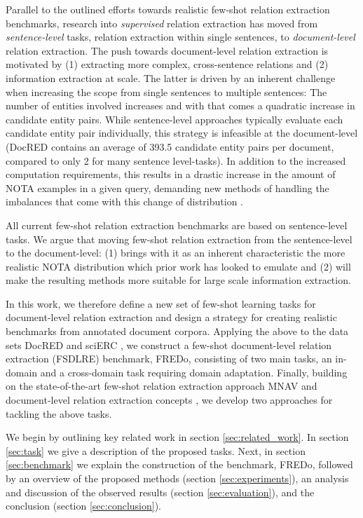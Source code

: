 \documentclass[11pt]{article}
\begin{document}
Parallel to the outlined efforts towards realistic few-shot relation extraction benchmarks, research into \textit{supervised} relation extraction has moved from \textit{sentence-level} tasks, relation extraction within single sentences, to \textit{document-level} relation extraction.
The push towards document-level relation extraction is motivated by (1) extracting more complex, cross-sentence relations and (2) information extraction at scale.
The latter is driven by an inherent challenge when increasing the scope from single sentences to multiple sentences: The number of entities involved increases and with that comes a quadratic increase in candidate entity pairs.
While sentence-level approaches typically evaluate each candidate entity pair individually, this strategy is infeasible at the document-level (DocRED contains an average of 393.5 candidate entity pairs per document, compared to only 2 for many sentence level-tasks).
In addition to the increased computation requirements, this results in a drastic increase in the amount of NOTA examples in a given query, demanding new methods of handling the imbalances that come with this change of distribution \cite{han_novel_2020,zhou_document-level_2020}.

All current few-shot relation extraction benchmarks are based on sentence-level tasks.
We argue that moving few-shot relation extraction from the sentence-level to the document-level: (1) brings with it as an inherent characteristic the more realistic NOTA distribution which prior work has looked to emulate and (2) will make the resulting methods more suitable for large scale information extraction.

In this work, we therefore define a new set of few-shot learning tasks for document-level relation extraction and design a strategy for creating realistic benchmarks from annotated document corpora.
Applying the above to the data sets DocRED \cite{yao_docred_2019} and sciERC \cite{luan_multi-task_2018}, we construct a few-shot document-level relation extraction (FSDLRE) benchmark, FREDo, consisting of two main tasks, an in-domain and a cross-domain task requiring domain adaptation. 
Finally, building on the state-of-the-art few-shot relation extraction approach MNAV \cite{sabo_revisiting_2021} and document-level relation extraction concepts \cite{zhou_document-level_2020}, we develop two approaches for tackling the above tasks.

We begin by outlining key related work in section \ref{sec:related_work}. In section \ref{sec:task} we give a description of the proposed tasks.
Next, in section \ref{sec:benchmark} we explain the construction of the benchmark, FREDo, followed by an overview of the proposed methods (section \ref{sec:experiments}), an analysis and discussion of the observed results (section \ref{sec:evaluation}), and the conclusion (section \ref{sec:conclusion}).
\end{document}
